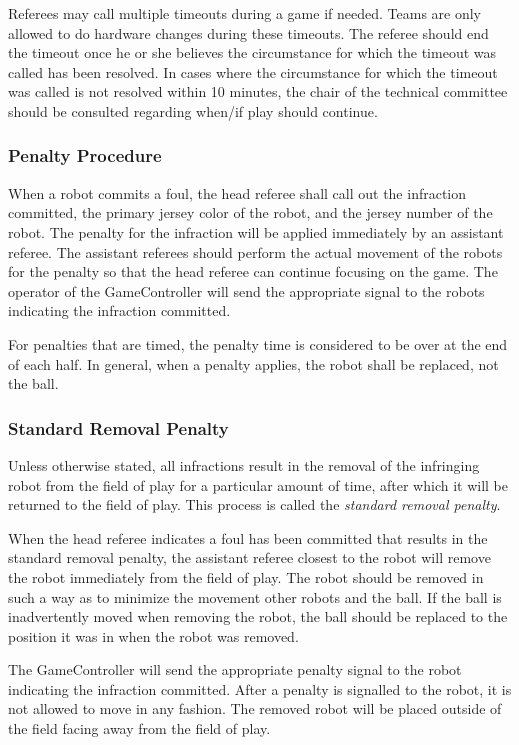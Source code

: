 Referees may call multiple timeouts during a game if needed.  Teams are only allowed to do hardware changes during these timeouts.  The referee should end the timeout once he or she believes the circumstance for which the timeout was called has been resolved.  In cases where the circumstance for which the timeout was called is not resolved within 10 minutes, the chair of the technical committee should be consulted regarding when/if play should continue.

\subsubsection{Penalty Procedure}
\label{sec:penalty_procedure}

When a robot commits a foul, the head referee shall call out the infraction committed, the primary jersey color of the robot, and the jersey number of the robot. The penalty for the infraction will be applied immediately by an assistant referee. The assistant referees should perform the actual movement of the robots for the penalty so that the head referee can continue focusing on the game. The operator of the GameController will send the appropriate signal to the robots indicating the infraction committed.

For penalties that are timed, the penalty time is considered to be over at the end of each half.
In general, when a penalty applies, the robot shall be replaced, not the ball.

\subsubsection{Standard Removal Penalty}
\label{sec:removal_penalty}

Unless otherwise stated, all infractions result in the removal of the infringing robot from the field of play for a particular amount of time, after which it will be returned to the field of play. This process is called the \textit{standard removal penalty}.

When the head referee indicates a foul has been committed that results in the standard removal penalty, the assistant referee closest to the robot will remove the robot immediately from the field of play. The robot should be removed in such a way as to minimize the movement other robots and the ball. If the ball is inadvertently moved when removing the robot, the ball should be replaced to the position it was in when the robot was removed.

The GameController will send the appropriate penalty signal to the robot indicating the infraction committed. After a penalty is signalled to the robot, it is not allowed to move in any fashion. The removed robot will be placed outside of the field facing away from the field of play.

